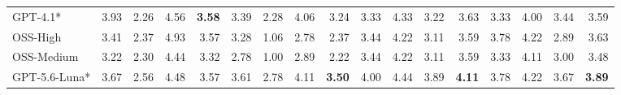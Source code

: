 \begin{table}[t]
\begin{tabular}{lrrrrrrrrrrrrrrrr}
GPT-4.1* & 3.93 & 2.26 & 4.56 & \textbf{3.58} & 3.39 & 2.28 & 4.06 & 3.24 & 3.33 & 4.33 & 3.22 & 3.63 & 3.33 & 4.00 & 3.44 & 3.59 \\
OSS-High & 3.41 & 2.37 & 4.93 & 3.57 & 3.28 & 1.06 & 2.78 & 2.37 & 3.44 & 4.22 & 3.11 & 3.59 & 3.78 & 4.22 & 2.89 & 3.63 \\
OSS-Medium & 3.22 & 2.30 & 4.44 & 3.32 & 2.78 & 1.00 & 2.89 & 2.22 & 3.44 & 4.22 & 3.11 & 3.59 & 3.33 & 4.11 & 3.00 & 3.48 \\
GPT-5.6-Luna* & 3.67 & 2.56 & 4.48 & 3.57 & 3.61 & 2.78 & 4.11 & \textbf{3.50} & 4.00 & 4.44 & 3.89 & \textbf{4.11} & 3.78 & 4.22 & 3.67 & \textbf{3.89} \\
\bottomrule
\end{tabular}
\end{table}
